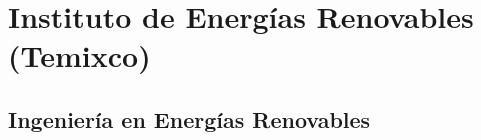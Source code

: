 \section{Instituto de Energías Renovables (Temixco)}

\subsection{Ingeniería en Energías Renovables}
